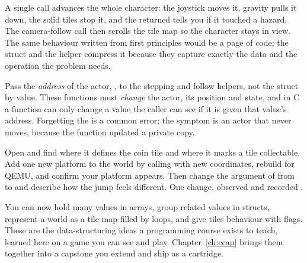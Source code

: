A single call advances the whole character: the joystick moves
it, gravity pulls it down, the solid tiles stop it, and the returned 
tells you if it touched a hazard. The camera-follow call then scrolls the tile map
so the character stays in view. The same behaviour written from first principles
would be a page of code; the struct and the helper compress it because they capture
exactly the data and the operation the problem needs.

\begin{prgwarn}
Pass the \emph{address} of the actor, , to the stepping and
follow helpers, not the struct by value. These functions must \emph{change} the
actor, its position and state, and in C a function can only change a value the
caller can see if it is given that value's address. Forgetting the \code{\&} is a
common error; the symptom is an actor that never moves, because the function
updated a private copy.
\end{prgwarn}

\begin{prgtry}
Open  and find where it defines the coin
tile and where it marks a tile collectable. Add one new platform to the world by
calling  with new coordinates, rebuild for QEMU, and confirm your
platform appears. Then change the  argument of
 from  to  and describe how the
jump feels different. One change, observed and recorded \citep{prg32repo}.
\end{prgtry}

\begin{prgcheck}
You can now hold many values in arrays, group related values in structs, represent
a world as a tile map filled by loops, and give tiles behaviour with flags. These
are the data-structuring ideas a programming course exists to teach, learned here
on a game you can see and play. Chapter~\ref{ch:ccap} brings them together into a
capstone you extend and ship as a cartridge.
\end{prgcheck}
